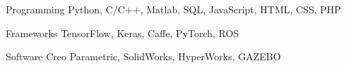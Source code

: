 


\begin{cvskills}


\cvskill
{Programming} %
{Python, C/C++, Matlab, SQL, JavaScript, HTML, CSS, PHP} %


\cvskill
{Frameworks} %
{TensorFlow, Keras, Caffe, PyTorch, ROS} %


\cvskill
{Software} %
{Creo Parametric, SolidWorks, HyperWorks, GAZEBO} %


\end{cvskills}